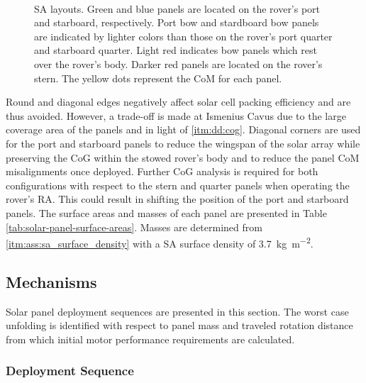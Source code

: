 \begin{figure}[h]
\begin{subfigure}[t]{\subfigureWidth}
		\label{fig:sub:solar-array-layouts-for-ismenius-cavus}
	\end{subfigure}\\[0.8ex]
    \caption[Solar array layouts]
            {\ac{SA} layouts. Green and blue panels are located on the rover's port and starboard, respectively. Port bow and stardboard bow panels are indicated by lighter colors than those on the rover's port quarter and starboard quarter. Light red indicates bow panels which rest over the rover's body. Darker red panels are located on the rover's stern. The yellow dots represent the \ac{CoM} for each panel.}
    \label{fig:solar-array-layouts-for-missions-sites}
\vspace{-2ex}
\end{figure}

\vspace{0.5cm}

Round and diagonal edges negatively affect solar cell packing efficiency and are thus avoided. However, a trade-off is made at Ismenius Cavus due to the large coverage area of the panels and in light of \ref{itm:dd:cog}. Diagonal corners are used for the port and starboard panels to reduce the wingspan of the solar array while preserving the \ac{CoG} within the stowed rover's body and to reduce the panel \ac{CoM} misalignments once deployed. Further \ac{CoG} analysis is required for both configurations with respect to the stern and quarter panels when operating the rover's \ac{RA}. This could result in shifting the position of the port and starboard panels. The surface areas and masses of each panel are presented in Table \ref{tab:solar-panel-surface-areas}. Masses are determined from \ref{itm:ass:sa_surface_density} with a \ac{SA} surface density of \SI{3.7}{kg.m^{-2}}.

\vspace{0.5cm}




\clearpage
\subsection{Mechanisms}
Solar panel deployment sequences are presented in this section. The worst case unfolding is identified with respect to panel mass and traveled rotation distance from which initial motor performance requirements are calculated.

\subsubsection{Deployment Sequence}

